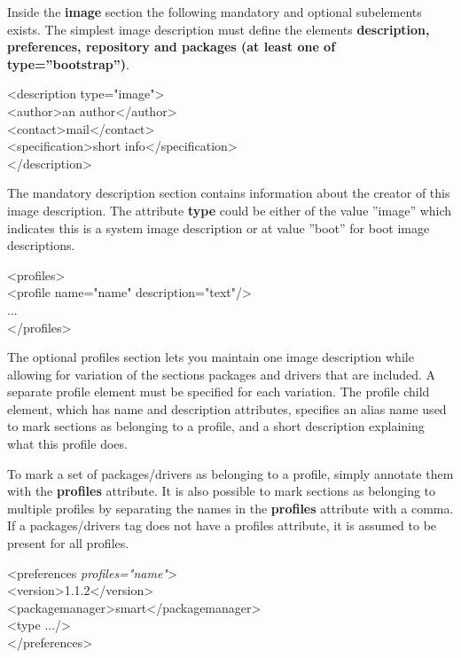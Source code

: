 Inside the \textbf{image} section the following mandatory and optional
subelements exists. The simplest image description must define the
elements \textbf{description, preferences, repository and
packages (at least one of type=''bootstrap'')}.

\begin{Command}{12cm}
<description type="image">\\
\hspace*{1cm}<author>an author</author>\\
\hspace*{1cm}<contact>mail</contact>\\
\hspace*{1cm}<specification>short info</specification>\\
</description>
\end{Command}

The mandatory description section contains information about
the creator of this image description. The attribute \textbf{type}
could be either of the value ''image'' which indicates this is a
system image description or at value ''boot'' for boot image
descriptions.

\begin{Command}{12cm}
<profiles>\\
\hspace*{1cm}<profile name="name" description="text"/>\\
\hspace*{1cm}...\\
</profiles>
\end{Command}

The optional profiles section lets you maintain one image description
while allowing for variation of the sections packages and drivers that are
included. A separate profile element must be specified for each variation.
The profile child element, which has name and description attributes,
specifies an alias name used to mark sections as belonging to a profile,
and a short description explaining what this profile does.

To mark a set of packages/drivers as belonging to a profile, simply
annotate them with the \textbf{profiles} attribute. It is also possible
to mark sections as belonging to multiple profiles by separating the
names in the \textbf{profiles} attribute with a comma.
If a packages/drivers tag does not have a profiles attribute, it is
assumed to be present for all profiles.

\begin{Command}{12cm}
<preferences \textit{profiles="name"}>\\
\hspace*{1cm}<version>1.1.2</version>\\
\hspace*{1cm}<packagemanager>smart</packagemanager>\\
\hspace*{1cm}<type .../>\\
</preferences>
\end{Command}

